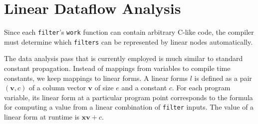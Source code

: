 \section{Linear Dataflow Analysis}
\label{sec:dataflow}

%
%
%



Since each {\tt filter}'s {\tt work} function can contain arbitrary C-like code,
the compiler must determine which {\tt filters} can be represented by linear nodes
automatically. 
 
The data analysis pass that is currently employed is much similar to standard constant propagation. 
Instead of mappings from variables to compile time constants, we keep mappings to linear forms.
A linear forms $l$ is defined as a pair $({\mathbf v}, c)$ of a column vector $\mathbf{v}$ of size $e$ 
and a constant $c$. For each program variable, its linear form at a particular program 
point corresponds to the formula for computing a value from a linear 
combination of {\tt filter} inputs. The value of a linear form at runtime is 
${\mathbf x}{\mathbf v} + c$.

